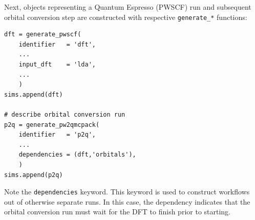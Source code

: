 Next, objects representing a Quantum Espresso (PWSCF) run and subsequent orbital conversion step are constructed with respective \texttt{generate\_*} functions:
\begin{lstlisting}
dft = generate_pwscf(
    identifier   = 'dft',
    ...
    input_dft    = 'lda',
    ...
    )
sims.append(dft)

# describe orbital conversion run                                                                    
p2q = generate_pw2qmcpack(
    identifier   = 'p2q',
    ...
    dependencies = (dft,'orbitals'),
    )
sims.append(p2q)
\end{lstlisting}
Note the \texttt{dependencies} keyword.  This keyword is used to construct workflows out of otherwise separate runs.  In this case, the dependency indicates that the orbital conversion run must wait for the DFT to finish prior to starting.

